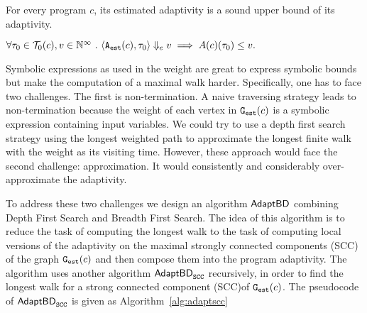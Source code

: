 %
\begin{thm}
    \label{thm:sound_progadapt}
    For every program $c$, 
    its estimated adaptivity is a sound upper bound of its adaptivity.
\begin{center}
$
     \forall \mathtt{\tau}_0 \in \mathcal{T}_{0}(c), v \in \mathbb{N}^{\infty} ~.~ 
\langle {\ensuremath{\mathtt{A_{est}}}}(c), \mathtt{\tau}_0 \rangle \Downarrow_e v \implies A(c)(\mathtt{\tau}_0) \leq v.
$
\end{center}
\end{thm}

Symbolic expressions as used in the weight  are great to express symbolic bounds but make the computation of 
a maximal walk harder. Specifically, one has to face two challenges. The first is non-termination.
A naive traversing strategy leads to non-termination
because the weight of each vertex in $\mathtt{{G_{est}}}({c})$
is a symbolic expression containing input variables.
We could try to use a depth first search strategy
using the longest weighted path to approximate
the longest finite walk with the weight as
its visiting time. However, these approach would face the second challenge: approximation.
It would consistently and considerably over-approximate the adaptivity.

To address these two challenges we design an algorithm $\mathsf{AdaptBD}$  combining 
Depth First Search and Breadth First Search.
The idea of this algorithm is to reduce the task of computing the longest walk to the task of computing local versions of the adaptivity on the maximal strongly connected components (SCC) of the graph $\mathtt{{G_{est}}}(c)$ and then compose them into the program adaptivity. The algorithm  uses  
another algorithm $\mathsf{AdaptBD}_{\mathtt{SCC}}$  recursively, in order to  find the longest walk for a strong connected component (SCC)of $\mathtt{{G_{est}}}(c)$. The pseudocode of $\mathsf{AdaptBD}_{\mathtt{SCC}}$ is given as Algorithm~\ref{alg:adaptscc}

